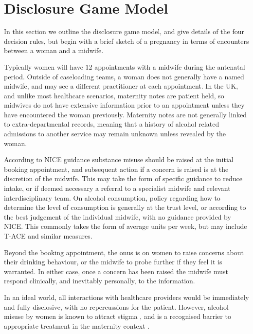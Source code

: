 \section{Disclosure Game Model}
\label{sec:model}

In this section we outline the disclosure game model, and give details of the four decision rules, but begin with a brief sketch of a pregnancy in terms of encounters between a woman and a midwife. 

Typically women will have 12 appointments with a midwife during the antenatal period. Outside of caseloading teams, a woman does not generally have a named midwife, and may see a different practitioner at each appointment. In the UK, and unlike most healthcare scenarios, maternity notes are patient held, so midwives do not have extensive information prior to an appointment unless they have encountered the woman previously. Maternity notes are not generally linked to extra-departmental records, meaning that a history of alcohol related admissions to another service may remain unknown unless revealed by the woman.

According to NICE guidance \citep{NICE2010a,NICE2010} substance misuse should be raised at the initial booking appointment, and subsequent action if a concern is raised is at the discretion of the midwife. This may take the form of specific guidance to reduce intake, or if deemed necessary a referral to a specialist midwife and relevant interdisciplinary team. On alcohol consumption, policy regarding how to determine the level of consumption is generally at the trust level, or according to the best judgement of the individual midwife, with no guidance provided by NICE. This commonly takes the form of average units per week, but may include \ac{T-ACE} and similar measures. 

Beyond the booking appointment, the onus is on women to raise concerns about their drinking behaviour, or the midwife to probe further if they feel it is warranted. In either case, once a concern has been raised the midwife must respond clinically, and inevitably personally, to the information.

In an ideal world, all interactions with healthcare providers would be immediately and fully disclosive, with no repercussions for the patient. However, alcohol misuse by women is known to attract stigma \citep{Gomberg1988}, and is a recognised barrier to appropriate treatment in the maternity context \citep{Radcliffe2011,NICE2010}.

